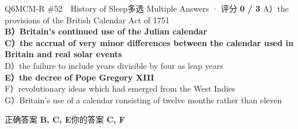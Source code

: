 \begin{qblock}{Q6\quad MCM-R \#52\ \ History of Sleep}{多选 Multiple Answers · 评分 \textcolor{cAccent}{\bfseries 0 / 3}}
{\small
A）the provisions of the British Calendar Act of 1751\\
{\color{cFix}\textbf{B）Britain's continued use of the Julian calendar}}\\
{\color{cFix}\textbf{C）the accrual of very minor differences between the calendar used in Britain and real solar events}}\\
D）the failure to include years divisible by four as leap years\\
{\color{cFix}\textbf{E）the decree of Pope Gregory XIII}}\\
F）revolutionary ideas which had emerged from the West Indies\\
G）Britain's use of a calendar consisting of twelve months rather than eleven}
\smallskip\par
{\small 正确答案 \textcolor{cFix}{\bfseries B, C, E}\qquad 你的答案 {\color{cWrong}\bfseries C, F}}
\end{qblock}


